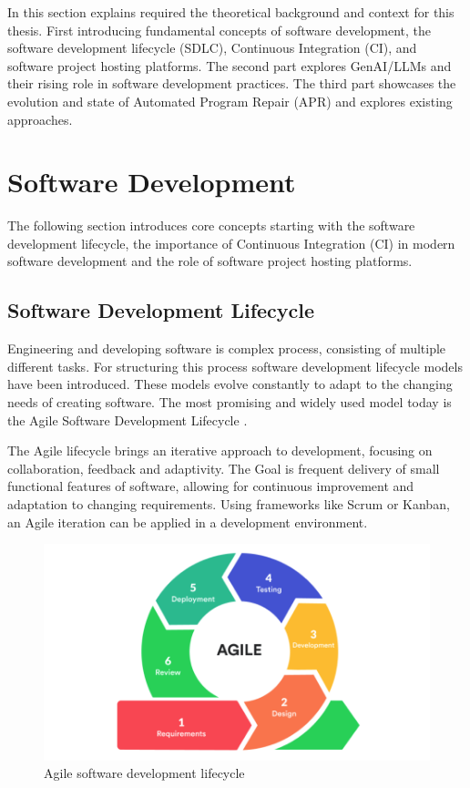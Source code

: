 In this section explains required the theoretical background and context for this thesis. First introducing fundamental concepts of software development, the software development lifecycle (SDLC), Continuous Integration (CI), and software project hosting platforms. The second part explores GenAI/LLMs and their rising role in software development practices. The third part showcases the evolution and state of Automated Program Repair (APR) and explores existing approaches.

\section{Software Development}

The following section introduces core concepts starting with the software development lifecycle, the importance of Continuous Integration (CI) in modern software development and the role of software project hosting platforms.
\subsection{Software Development Lifecycle}

Engineering and developing software is complex process, consisting of multiple different tasks. For structuring this process software development lifecycle models have been introduced. These models evolve constantly to adapt to the changing needs of creating software. The most promising and widely used model today is the Agile Software Development Lifecycle \cite{rupareliaSoftwareDevelopmentLifecycle2010}.

The Agile lifecycle brings an iterative approach to development, focusing on collaboration, feedback and adaptivity. The Goal is frequent delivery of small functional features of software, allowing for continuous improvement and adaptation to changing requirements. Using frameworks like Scrum or Kanban, an Agile iteration can be applied in a development environment\cite{rupareliaSoftwareDevelopmentLifecycle2010}.

\begin{figure}[H]
    \centering
    \includegraphics[width=1\textwidth]{images/agile-cycle.png}
    \caption{Agile software development lifecycle}
    \label{fig:agile-cycle}
\end{figure}


